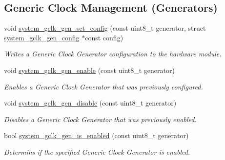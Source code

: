 \subsection*{Generic Clock Management (Generators)}
\begin{DoxyCompactItemize}
\item 
void \hyperlink{group__asfdoc__sam0__system__clock__group_gacfd3360ccc8abb013f66b11ff44a5d0d}{system\+\_\+gclk\+\_\+gen\+\_\+set\+\_\+config} (const uint8\+\_\+t generator, struct \hyperlink{structsystem__gclk__gen__config}{system\+\_\+gclk\+\_\+gen\+\_\+config} $\ast$const config)
\begin{DoxyCompactList}\small\item\em Writes a Generic Clock Generator configuration to the hardware module. \end{DoxyCompactList}\item 
void \hyperlink{group__asfdoc__sam0__system__clock__group_ga2bad007fcf1f649a3919dcc72dccea8b}{system\+\_\+gclk\+\_\+gen\+\_\+enable} (const uint8\+\_\+t generator)
\begin{DoxyCompactList}\small\item\em Enables a Generic Clock Generator that was previously configured. \end{DoxyCompactList}\item 
void \hyperlink{group__asfdoc__sam0__system__clock__group_ga98a280a22a780c05e87c676f8c651dc3}{system\+\_\+gclk\+\_\+gen\+\_\+disable} (const uint8\+\_\+t generator)
\begin{DoxyCompactList}\small\item\em Disables a Generic Clock Generator that was previously enabled. \end{DoxyCompactList}\item 
bool \hyperlink{group__asfdoc__sam0__system__clock__group_ga113af9a430f74e082401383109e4eefd}{system\+\_\+gclk\+\_\+gen\+\_\+is\+\_\+enabled} (const uint8\+\_\+t generator)
\begin{DoxyCompactList}\small\item\em Determins if the specified Generic Clock Generator is enabled. \end{DoxyCompactList}\end{DoxyCompactItemize}
